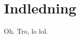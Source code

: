 \documentclass[danish]{article}
\begin{document}
\section{Indledning}
Oh. Tro, lo lol. 
\end{document}
